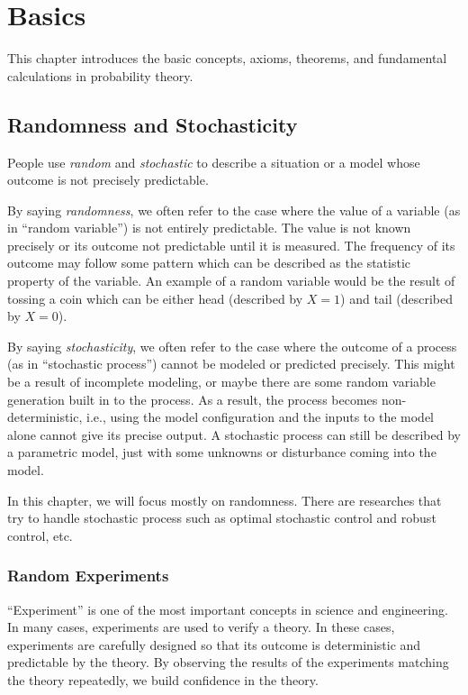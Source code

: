 \chapter{Basics} \label{ch:pbbasics}

This chapter introduces the basic concepts, axioms, theorems, and fundamental calculations in probability theory.

\section{Randomness and Stochasticity}

People use \textit{random} and \textit{stochastic} to describe a situation or a model whose outcome is not precisely predictable.

By saying \textit{randomness}, we often refer to the case where the value of a variable (as in ``random variable'') is not entirely predictable. The value is not known precisely or its outcome not predictable until it is measured. The frequency of its outcome may follow some pattern which can be described as the statistic property of the variable. An example of a random variable would be the result of tossing a coin which can be either head (described by $X=1$) and tail (described by $X=0$).

By saying \textit{stochasticity}, we often refer to the case where the outcome of a process (as in ``stochastic process'') cannot be modeled or predicted precisely. This might be a result of incomplete modeling, or maybe there are some random variable generation built in to the process. As a result, the process becomes non-deterministic, i.e., using the model configuration and the inputs to the model alone cannot give its precise output. A stochastic process can still be described by a parametric model, just with some unknowns or disturbance coming into the model.

In this chapter, we will focus mostly on randomness. There are researches that try to handle stochastic process such as optimal stochastic control and robust control, etc.

\subsection{Random Experiments}

``Experiment'' is one of the most important concepts in science and engineering. In many cases, experiments are used to verify a theory. In these cases, experiments are carefully designed so that its outcome is deterministic and predictable by the theory. By observing the results of the experiments matching the theory repeatedly, we build confidence in the theory.

